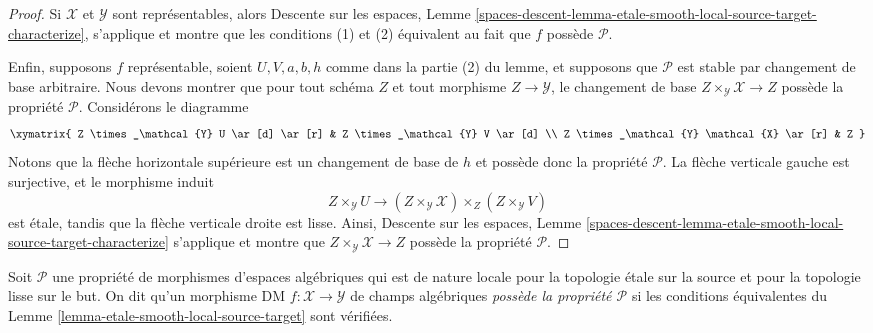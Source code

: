\begin{proof}
\medskip\noindent
Si $\mathcal{X}$ et $\mathcal{Y}$ sont représentables, alors
Descente sur les espaces,
Lemme \ref{spaces-descent-lemma-etale-smooth-local-source-target-characterize},
s'applique et montre que les conditions (1) et (2) équivalent au fait que $f$ possède
$\mathcal{P}$.

\medskip\noindent
Enfin, supposons $f$ représentable, soient $U, V, a, b, h$
comme dans la partie (2) du lemme, et supposons que $\mathcal{P}$ est stable par
changement de base arbitraire. Nous devons montrer que pour tout schéma
$Z$ et tout morphisme $Z \to \mathcal{Y}$, le changement de base
$Z \times_\mathcal{Y} \mathcal{X} \to Z$
possède la propriété $\mathcal{P}$. Considérons le diagramme
$$
\xymatrix{
Z \times_\mathcal{Y} U \ar[d] \ar[r] &
Z \times_\mathcal{Y} V \ar[d] \\
Z \times_\mathcal{Y} \mathcal{X} \ar[r] &
Z
}
$$
Notons que la flèche horizontale supérieure est un changement de base de $h$ et
possède donc la propriété $\mathcal{P}$. La flèche verticale gauche est
surjective, et le morphisme induit
$$
Z \times_\mathcal{Y} U \longrightarrow
(Z \times_\mathcal{Y} \mathcal{X}) \times_Z (Z \times_\mathcal{Y} V)
$$
est \'etale, tandis que la flèche verticale droite est lisse. Ainsi,
Descente sur les espaces,
Lemme \ref{spaces-descent-lemma-etale-smooth-local-source-target-characterize}
s'applique et montre que $Z \times_\mathcal{Y} \mathcal{X} \to Z$
possède la propriété $\mathcal{P}$.
\end{proof}

\begin{definition}
\label{definition-etale-smooth-P}
Soit $\mathcal{P}$ une propriété de morphismes d'espaces algébriques
qui est de nature locale pour la topologie \'etale sur la source et pour la topologie lisse sur le but.
On dit qu'un morphisme DM $f : \mathcal{X} \to \mathcal{Y}$ de champs algébriques
{\it possède la propriété $\mathcal{P}$} si les conditions équivalentes du
Lemme \ref{lemma-etale-smooth-local-source-target}
sont vérifiées.
\end{definition}

